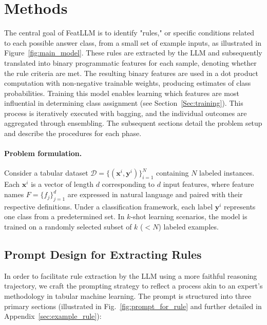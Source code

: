 \section{Methods}
The central goal of \textsf{FeatLLM} is to identify "rules," or specific conditions related to each possible answer class, from a small set of example inputs, as illustrated in Figure~\ref{fig:main_model}. These rules are extracted by the LLM and subsequently translated into binary programmatic features for each sample, denoting whether the rule criteria are met. The resulting binary features are used in a dot product computation with non-negative trainable weights, producing estimates of class probabilities. Training this model enables learning which features are most influential in determining class assignment (see Section~\ref{Sec:training}). This process is iteratively executed with bagging, and the individual outcomes are aggregated through ensembling. The subsequent sections detail the problem setup and describe the procedures for each phase.

\vspace*{-0.12in}
\paragraph{Problem formulation.} Consider a tabular dataset $\mathcal{D} = \{(\mathbf{x}^i, \mathbf{y}^i)\}_{i=1}^{N}$ containing $N$ labeled instances. Each $\mathbf{x}^i$ is a vector of length $d$ corresponding to $d$ input features, where feature names $F = \{f_j\}_{j=1}^{d}$ are expressed in natural language and paired with their respective definitions. Under a classification framework, each label $\mathbf{y}^i$ represents one class from a predetermined set. In $k$-shot learning scenarios, the model is trained on a randomly selected subset of $k$ ($<N$) labeled examples.

\subsection{Prompt Design for Extracting Rules}
\label{Sec:prompt_design}
In order to facilitate rule extraction by the LLM using a more faithful reasoning trajectory, we craft the prompting strategy to reflect a process akin to an expert's methodology in tabular machine learning. The prompt is structured into three primary sections (illustrated in Fig.~\ref{fig:prompt_for_rule} and further detailed in Appendix~\ref{sec:example_rule}):

\vspace*{-0.12in}
